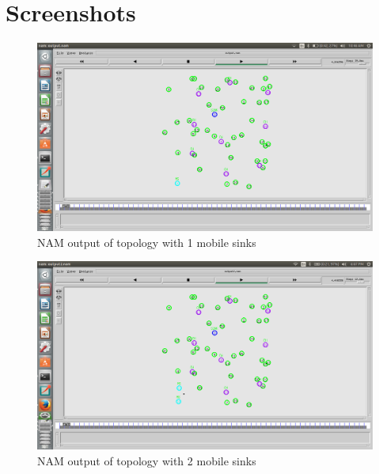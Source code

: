 \documentclass[MTech]{iitmdiss}
\begin{document}



\appendix
  \chapter{Screenshots}
\begin{figure}[ht!]
\centering
\includegraphics[scale=0.25]{output1sink.PNG}
\caption{NAM output of topology with 1 mobile sinks\label{overflow}}
\label{f6}
\end{figure}
\begin{figure}[h]
\centering
\includegraphics[scale=0.25]{output2sink.PNG}
\caption{NAM output of topology with 2 mobile sinks\label{overflow}}
\label{f7}
\end{figure}
\end{document}
